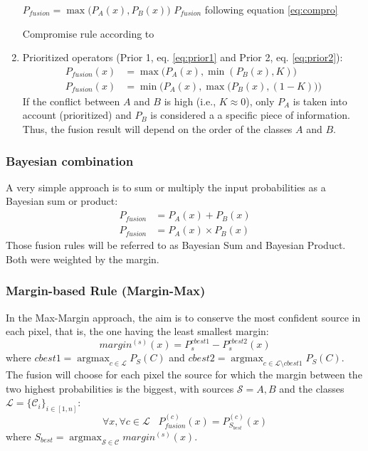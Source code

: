 \documentclass[10pt]{article}
\DeclareMathOperator{\argmax}{argmax}
\begin{document}
\begin{enumerate}
    \begin{algorithm}[H]
        \begin{algorithmic}
            \State $P_{fusion}=\max\big(P_A(x),P_B(x)\big)$
            \Else
            \State $P_{fusion}$ following equation \ref{eq:compro}
            \EndIf
        \end{algorithmic}
        \caption{Compromise rule according to \cite{ouerghemmi_two-step_2017}}
        \label{alg:comp-wo}
    \end{algorithm}
    \item Prioritized operators (Prior 1, eq. \ref{eq:prior1} and Prior 2, eq. \ref{eq:prior2}):
    \begin{align}
        P_{fusion}(x)&=\max\big(P_A(x),\min(P_B(x),K)\big)\label{eq:prior1}\\
        P_{fusion}(x)&=\min\Big(P_A(x),\max\big(P_B(x),(1-K)\big)\Big)\label{eq:prior2}
    \end{align}
    If the conflict between $A$ and $B$ is high (i.e., $K\approx 0$), only $P_A$ is taken into account (prioritized) and $P_B$ is considered a a specific piece of information. Thus, the fusion result will depend on the order of the classes $A$ and $B$.
\end{enumerate}

\subsubsection{Bayesian combination}\label{sec:bayesian}
A very simple approach is to sum or multiply the input probabilities as a Bayesian sum or product:
\begin{align}
    P_{fusion}&=P_A(x)+P_B(x)\\
    P_{fusion}&=P_A(x)\times P_B(x)
\end{align}
Those fusion rules will be referred to as Bayesian Sum and Bayesian Product. Both were weighted by the margin. %
\subsubsection{Margin-based Rule (Margin-Max)}\label{sec:margin}
In the Max-Margin approach, the aim is to conserve the most confident source in each pixel, that is, the one having the least smallest margin:
\begin{equation}
    margin^{(s)}(x)=P_s^{cbest1}-P_s^{cbest2}(x)
\end{equation}
where $cbest1=\argmax_{c\in\mathcal{L}}P_S(C)$ and $cbest2=\argmax_{c\in\mathcal{L}\setminus cbest1}P_S(C)$. The fusion will choose for each pixel the source for which the margin between the two highest probabilities is the biggest, with sources $\mathcal{S}={A,B}$ and the classes $\mathcal{L}=\{\mathcal{C}_i\}_{i\in[1,n]}$:
\begin{equation}
    \forall x,\forall c\in \mathcal{L}\;\;\; P_{fusion}^{(c)}(x)=P_{S_{best}}^{(c)}(x)
\end{equation}
where $S_{best}=\argmax_{\mathcal{S}\in\mathcal{C}}margin^{(s)}(x)$.
\end{document}
